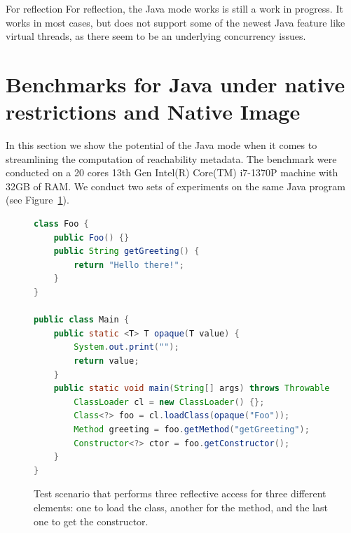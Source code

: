 For reflection 
For reflection, the Java mode works is still a work in progress. It works in most cases, but does not support some of the newest Java feature like virtual threads, as there seem to be an underlying concurrency issues.  

% 
% 

\section{Benchmarks for Java under native restrictions and Native Image}\label{benchmark}
In this section we show the potential of the Java mode when it comes to streamlining the computation of reachability metadata. The benchmark were conducted on a 20 cores 13th Gen Intel(R) Core(TM) i7-1370P machine with 32GB of RAM. We conduct two sets of experiments on the same Java program (see Figure~\ref{fig:benchmark}). 

\begin{figure}[ht]
    \centering
\begin{lstlisting}[language=Java]
class Foo {
    public Foo() {}
    public String getGreeting() {
        return "Hello there!";
    }
}

public class Main {
    public static <T> T opaque(T value) {
        System.out.print("");
        return value;
    }
    public static void main(String[] args) throws Throwable {
        ClassLoader cl = new ClassLoader() {};
        Class<?> foo = cl.loadClass(opaque("Foo"));
        Method greeting = foo.getMethod("getGreeting");
        Constructor<?> ctor = foo.getConstructor();
    }
}
\end{lstlisting}
    \caption{Test scenario that performs three reflective access for three different elements: one to load the class, another for the method, and the last one to get the constructor.}
    \label{fig:benchmark}
\end{figure}

